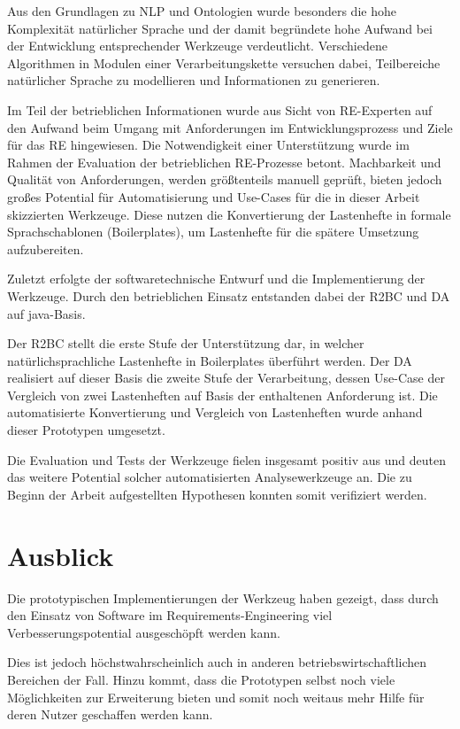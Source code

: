 \documentclass[12pt]{report}
\begin{document}
\vspace{12pt}
Aus den Grundlagen zu NLP und Ontologien wurde besonders die hohe Komplexität natürlicher Sprache und der damit begründete hohe Aufwand bei der Entwicklung entsprechender Werkzeuge verdeutlicht. Verschiedene Algorithmen in Modulen einer Verarbeitungskette versuchen dabei, Teilbereiche natürlicher Sprache zu modellieren und Informationen zu generieren. 

Im Teil der betrieblichen Informationen wurde aus Sicht von RE-Experten auf den Aufwand beim Umgang mit Anforderungen im Entwicklungsprozess und Ziele für das RE hingewiesen. Die Notwendigkeit einer Unterstützung wurde im Rahmen der Evaluation der betrieblichen RE-Prozesse betont. Machbarkeit und Qualität von Anforderungen, werden größtenteils manuell geprüft, bieten jedoch großes Potential für Automatisierung und Use-Cases für die in dieser Arbeit skizzierten Werkzeuge. Diese nutzen die Konvertierung der Lastenhefte in formale Sprachschablonen (Boilerplates), um Lastenhefte für die spätere Umsetzung aufzubereiten.

Zuletzt erfolgte der softwaretechnische Entwurf und die Implementierung der Werkzeuge. Durch den betrieblichen Einsatz entstanden dabei der R2BC und DA auf java-Basis.

Der R2BC stellt die erste Stufe der Unterstützung dar, in welcher natürlichsprachliche Lastenhefte in Boilerplates überführt werden. Der DA realisiert auf dieser Basis die zweite Stufe der Verarbeitung, dessen Use-Case der Vergleich von zwei Lastenheften auf Basis der enthaltenen Anforderung ist. Die automatisierte Konvertierung und Vergleich von Lastenheften wurde anhand dieser Prototypen umgesetzt. 

\vspace{12pt}
Die Evaluation und Tests der Werkzeuge fielen insgesamt positiv aus und deuten das weitere Potential solcher automatisierten Analysewerkzeuge an. Die zu Beginn der Arbeit aufgestellten Hypothesen konnten somit verifiziert werden.
\section{Ausblick}
Die prototypischen Implementierungen der Werkzeug haben gezeigt, dass durch den Einsatz von Software im Requirements-Engineering viel Verbesserungspotential ausgeschöpft werden kann. 

Dies ist jedoch höchstwahrscheinlich auch in anderen betriebswirtschaftlichen Bereichen der Fall. Hinzu kommt, dass die Prototypen selbst noch viele Möglichkeiten zur Erweiterung bieten und somit noch weitaus mehr Hilfe für deren Nutzer geschaffen werden kann. 
\end{document}
